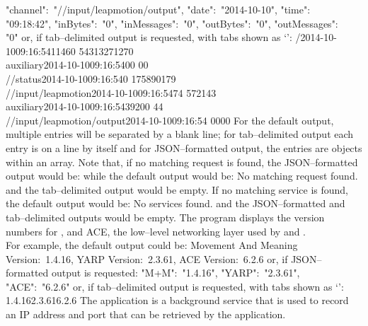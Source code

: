 \textbraceleft{} "channel":\ "/\serviceName/input/leapmotion/output", "date":\
"2014-10-10", "time":\ \\
"09:18:42", "inBytes":\ "0", "inMessages":\ "0", "outBytes":\ "0", "outMessages":\ \\
"0" \textbraceright{} \closeSq{} \closeSq
\outputEnd{}
\newpage
or, if tab--delimited output is requested, with tabs shown as `\tabSymbol':
\outputBegin{}
/\dollarService\pseudotab{}2014-10-10\pseudotab{}09:16:54\pseudotab{}11460%
\pseudotab{}54313\pseudotab{}271\pseudotab{}270\\
auxiliary\pseudotab{}2014-10-10\pseudotab{}09:16:54\pseudotab{}0\pseudotab{}0\pseudotab{}%
0\pseudotab{}0\\
/\dollarService/status\pseudotab{}2014-10-10\pseudotab{}09:16:54\pseudotab{}0%
\pseudotab{}17589\pseudotab{}0\pseudotab{}179\\
/\serviceName/input/leapmotion\pseudotab{}2014-10-10\pseudotab{}09:16:54\pseudotab{}74%
\pseudotab{}5721\pseudotab{}4\pseudotab{}3\\
auxiliary\pseudotab{}2014-10-10\pseudotab{}09:16:54\pseudotab{}39\pseudotab{}200%
\pseudotab{}4\pseudotab{}4\\
/\serviceName/input/leapmotion/output\pseudotab{}2014-10-10\pseudotab{}09:16:54%
\pseudotab{}0\pseudotab{}0\pseudotab{}0\pseudotab{}0
\outputEnd{}
For the default output, multiple entries will be separated by a blank line; for
tab--delimited output each entry is on a line by itself and for JSON--formatted output,
the entries are objects within an array.
Note that, if no matching request is found, the JSON--formatted output would be:
\outputBegin{}
\sqPair
\outputEnd{}
while the default output would be:
\outputBegin{}
No matching request found.
\outputEnd{}
and the tab--delimited output would be empty.
If no matching service is found, the default output would be:
\outputBegin{}
No services found.
\outputEnd{}
and the JSON--formatted and tab--delimited outputs would be empty.
\tertiaryEnd{\utilityNameE{mpmServiceMetrics}}
The program  displays the version numbers for \mplusm{}, \yarp{}
and ACE, the low--level networking layer used by \mplusm{} and \yarp{}.\\

For example, the default output could be:
\outputBegin{}
Movement And Meaning Version:\ 1.4.16, YARP Version:\ 2.3.61, ACE Version:\ 6.2.6
\outputEnd{}
or, if JSON--formatted output is requested:
\outputBegin{}
\textbraceleft{} "M+M":\ "1.4.16", "YARP":\ "2.3.61", "ACE":\ "6.2.6" \textbraceright
\outputEnd{}
or, if tab--delimited output is requested, with tabs shown as `\tabSymbol':
\outputBegin{}
1.4.16\pseudotab{}2.3.61\pseudotab{}6.2.6
\outputEnd{}
\secondaryEnd{}
\newpage
{}
\tertiaryStart{\utilityNameP{mpmAddressService}}
The  application is a background service that is used to
record an IP address and port that can be retrieved by the 
application.\\

